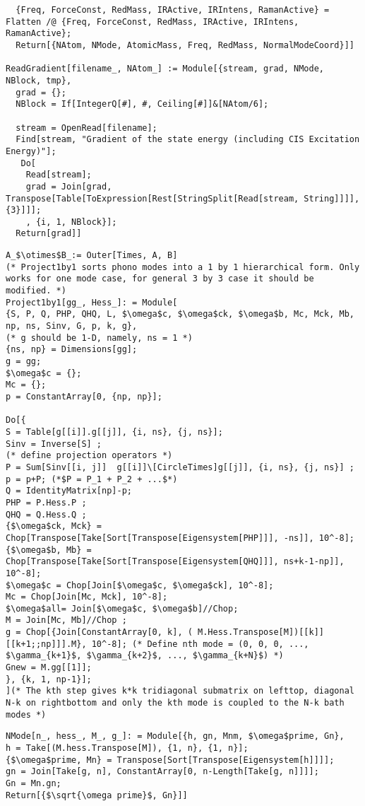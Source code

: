 \begin{lstlisting}
  {Freq, ForceConst, RedMass, IRActive, IRIntens, RamanActive} = Flatten /@ {Freq, ForceConst, RedMass, IRActive, IRIntens, RamanActive};
  Return[{NAtom, NMode, AtomicMass, Freq, RedMass, NormalModeCoord}]]

ReadGradient[filename_, NAtom_] := Module[{stream, grad, NMode, NBlock, tmp},
  grad = {};
  NBlock = If[IntegerQ[#], #, Ceiling[#]]&[NAtom/6];

  stream = OpenRead[filename];
  Find[stream, "Gradient of the state energy (including CIS Excitation Energy)"];
   Do[
    Read[stream];
    grad = Join[grad, Transpose[Table[ToExpression[Rest[StringSplit[Read[stream, String]]]], {3}]]];
    , {i, 1, NBlock}];
  Return[grad]]
\end{lstlisting}
\begin{lstlisting}
A_$\otimes$B_:= Outer[Times, A, B]
(* Project1by1 sorts phono modes into a 1 by 1 hierarchical form. Only works for one mode case, for general 3 by 3 case it should be modified. *)
Project1by1[gg_, Hess_]: = Module[
{S, P, Q, PHP, QHQ, L, $\omega$c, $\omega$ck, $\omega$b, Mc, Mck, Mb, np, ns, Sinv, G, p, k, g},
(* g should be 1-D, namely, ns = 1 *)
{ns, np} = Dimensions[gg];
g = gg;
$\omega$c = {};
Mc = {};
p = ConstantArray[0, {np, np}];

Do[{
S = Table[g[[i]].g[[j]], {i, ns}, {j, ns}];
Sinv = Inverse[S] ;
(* define projection operators *)
P = Sum[Sinv[[i, j]]  g[[i]]\[CircleTimes]g[[j]], {i, ns}, {j, ns}] ;
p = p+P; (*$P = P_1 + P_2 + ...$*)
Q = IdentityMatrix[np]-p;
PHP = P.Hess.P ;
QHQ = Q.Hess.Q ;
{$\omega$ck, Mck} = Chop[Transpose[Take[Sort[Transpose[Eigensystem[PHP]]], -ns]], 10^-8];
{$\omega$b, Mb} = Chop[Transpose[Take[Sort[Transpose[Eigensystem[QHQ]]], ns+k-1-np]], 10^-8];
$\omega$c = Chop[Join[$\omega$c, $\omega$ck], 10^-8];
Mc = Chop[Join[Mc, Mck], 10^-8];
$\omega$all= Join[$\omega$c, $\omega$b]//Chop;
M = Join[Mc, Mb]//Chop ;
g = Chop[{Join[ConstantArray[0, k], ( M.Hess.Transpose[M])[[k]][[k+1;;np]]].M}, 10^-8]; (* Define nth mode = (0, 0, 0, ..., $\gamma_{k+1}$, $\gamma_{k+2}$, ..., $\gamma_{k+N}$) *)
Gnew = M.gg[[1]];
}, {k, 1, np-1}];
](* The kth step gives k*k tridiagonal submatrix on lefttop, diagonal N-k on rightbottom and only the kth mode is coupled to the N-k bath modes *)
\end{lstlisting}
\begin{lstlisting}
NMode[n_, hess_, M_, g_]: = Module[{h, gn, Mnm, $\omega$prime, Gn},
h = Take[(M.hess.Transpose[M]), {1, n}, {1, n}];
{$\omega$prime, Mn} = Transpose[Sort[Transpose[Eigensystem[h]]]];
gn = Join[Take[g, n], ConstantArray[0, n-Length[Take[g, n]]]];
Gn = Mn.gn;
Return[{$\sqrt{\omega prime}$, Gn}]]
\end{lstlisting}
